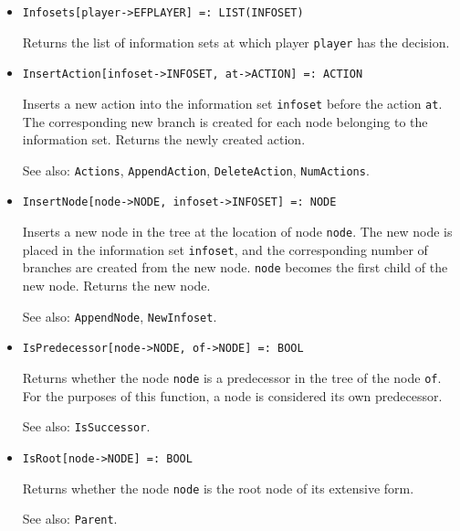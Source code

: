 \begin{itemize}
\item
\protect \large \begin{verbatim}
Infosets[player->EFPLAYER] =: LIST(INFOSET)
\end{verbatim}\normalsize

\bd
Returns the list of information sets at which player
\verb+player+ has the decision.
\ed

\item
\protect \large \begin{verbatim}
InsertAction[infoset->INFOSET, at->ACTION] =: ACTION
\end{verbatim}\normalsize

\bd
Inserts a new action into the information set \verb+infoset+
before the action \verb+at+.  The corresponding new branch is created for
each node belonging to the information set.  Returns the newly created action.
\item
[See also:] {\tt Actions}, {\tt AppendAction}, {\tt DeleteAction},
{\tt NumActions}.
\ed

\item
\protect \large \begin{verbatim}
InsertNode[node->NODE, infoset->INFOSET] =: NODE
\end{verbatim}\normalsize

\bd
Inserts a new node in the tree at the location of
node \verb+node+.  The
new node is placed in the information set \verb+infoset+, and the
corresponding number of branches are created from the new node.  \verb+node+
becomes the first child of the new node.  Returns the new node.
\item
[See also:] {\tt AppendNode}, {\tt NewInfoset}.
\ed

\item
\protect \large \begin{verbatim}
IsPredecessor[node->NODE, of->NODE] =: BOOL
\end{verbatim}\normalsize

\bd
Returns whether the node \verb+node+ is a predecessor
in the tree of the node \verb+of+.  For the purposes of this function,
a node is considered its own predecessor.
\item
[See also:] {\tt IsSuccessor}.
\ed

\item
\protect \large \begin{verbatim}
IsRoot[node->NODE] =: BOOL
\end{verbatim}\normalsize

\bd
Returns whether the node \verb+node+ is the root node of its
extensive form.
\item
[See also:] {\tt Parent}.
\ed


\end{itemize}
